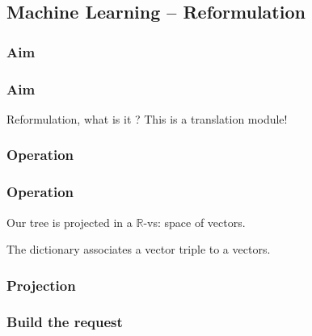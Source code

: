 \subsection{Machine Learning \--- Reformulation}

\subsubsection{Aim}

\begin{frame}
\frametitle{Aim}
Reformulation, what is it ?
\pause
This is a translation module! %

\end{frame}

\subsubsection{Operation}
\begin{frame}
\frametitle{Operation}
Our tree is projected in a $\mathbb{R}$-vs: space of vectors.

\begin{defi}
The dictionary associates a vector triple to a vectors.

\end{defi}

\end{frame}

\begin{frame}
\frametitle{Projection}
\end{frame}

\subsubsection{Build the request}

